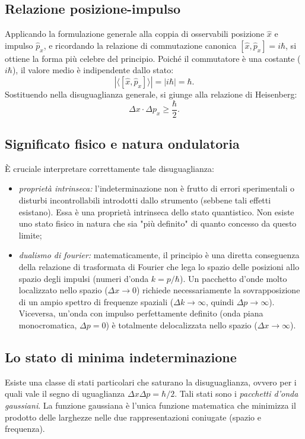 \documentclass[a4paper,11pt]{report}
\begin{document}
\subsection{Relazione posizione-impulso}
Applicando la formulazione generale alla coppia di osservabili posizione $\hat{x}$ e impulso $\hat{p}_x$, e ricordando la relazione di commutazione canonica $[\hat{x}, \hat{p}_x] = i\hbar$, si ottiene la forma più celebre del principio.
Poiché il commutatore è una costante ($i\hbar$), il valore medio è indipendente dallo stato:
\begin{equation}
    \left| \langle [\hat{x}, \hat{p}_x] \rangle \right| = |i\hbar| = \hbar.
\end{equation}
Sostituendo nella disuguaglianza generale, si giunge alla relazione di Heisenberg:
\begin{equation}
    \Delta x \cdot \Delta p_x \geq \frac{\hbar}{2}.
\end{equation}

\subsection{Significato fisico e natura ondulatoria}
È cruciale interpretare correttamente tale disuguaglianza:
\begin{itemize}
    \item \textit{proprietà intrinseca:} l'indeterminazione non è frutto di errori sperimentali o disturbi incontrollabili introdotti dallo strumento (sebbene tali effetti esistano). Essa è una proprietà intrinseca dello stato quantistico. Non esiste uno stato fisico in natura che sia "più definito" di quanto concesso da questo limite;
    
    \item \textit{dualismo di fourier:} matematicamente, il principio è una diretta conseguenza della relazione di trasformata di Fourier che lega lo spazio delle posizioni allo spazio degli impulsi (numeri d'onda $k = p/\hbar$).
    Un pacchetto d'onde molto localizzato nello spazio ($\Delta x \to 0$) richiede necessariamente la sovrapposizione di un ampio spettro di frequenze spaziali ($\Delta k \to \infty$, quindi $\Delta p \to \infty$). Viceversa, un'onda con impulso perfettamente definito (onda piana monocromatica, $\Delta p = 0$) è totalmente delocalizzata nello spazio ($\Delta x \to \infty$).
\end{itemize}


\subsection{Lo stato di minima indeterminazione}
Esiste una classe di stati particolari che saturano la disuguaglianza, ovvero per i quali vale il segno di uguaglianza $\Delta x \Delta p = \hbar/2$.
Tali stati sono i \textit{pacchetti d'onda gaussiani}. La funzione gaussiana è l'unica funzione matematica che minimizza il prodotto delle larghezze nelle due rappresentazioni coniugate (spazio e frequenza).
\end{document}
